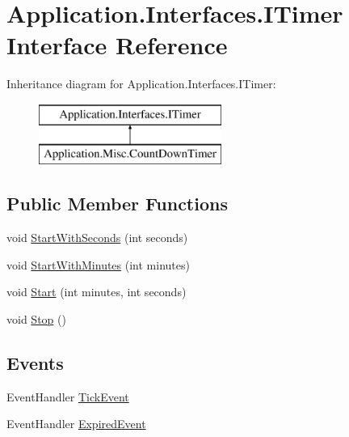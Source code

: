 \hypertarget{interface_application_1_1_interfaces_1_1_i_timer}{}\section{Application.\+Interfaces.\+I\+Timer Interface Reference}
\label{interface_application_1_1_interfaces_1_1_i_timer}
Inheritance diagram for Application.\+Interfaces.\+I\+Timer\+:\begin{figure}[H]
\begin{center}
\leavevmode
\includegraphics[height=2.000000cm]{interface_application_1_1_interfaces_1_1_i_timer}
\end{center}
\end{figure}
\subsection*{Public Member Functions}
\begin{DoxyCompactItemize}
\item 
void \mbox{\hyperlink{interface_application_1_1_interfaces_1_1_i_timer_a220100133da4e47f2a1654966f33e9e6}{Start\+With\+Seconds}} (int seconds)
\item 
void \mbox{\hyperlink{interface_application_1_1_interfaces_1_1_i_timer_af2759fd575f1ae0a8df31f753bfeaf07}{Start\+With\+Minutes}} (int minutes)
\item 
void \mbox{\hyperlink{interface_application_1_1_interfaces_1_1_i_timer_a127e73defb495fef00e24cdc0f73936e}{Start}} (int minutes, int seconds)
\item 
void \mbox{\hyperlink{interface_application_1_1_interfaces_1_1_i_timer_a20bbfb25ff2343e0d3ea4b6ea708af90}{Stop}} ()
\end{DoxyCompactItemize}
\subsection*{Events}
\begin{DoxyCompactItemize}
\item 
Event\+Handler \mbox{\hyperlink{interface_application_1_1_interfaces_1_1_i_timer_af8955cf4dc8aa8183653cb62b713defd}{Tick\+Event}}
\item 
Event\+Handler \mbox{\hyperlink{interface_application_1_1_interfaces_1_1_i_timer_a0deff851942159fe368552fbeeaa3686}{Expired\+Event}}
\end{DoxyCompactItemize}


